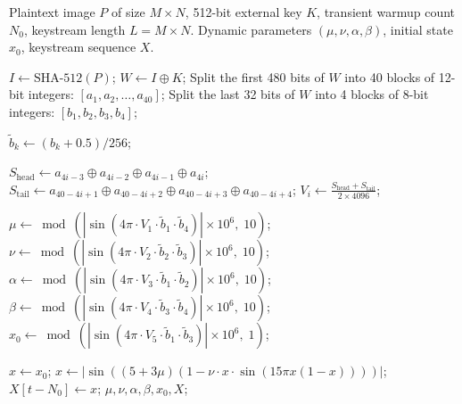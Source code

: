 \begin{algorithm}[htbp]
\caption{SHA-512 and External Key Driven Keystream Generation}
\label{alg:keystream_complete}
\begin{algorithmic}[1]
\REQUIRE Plaintext image $P$ of size $M \times N$, 512-bit external key $K$, transient warmup count $N_0$, keystream length $L = M \times N$.
\ENSURE Dynamic parameters $(\mu, \nu, \alpha, \beta)$, initial state $x_0$, keystream sequence $X$.

\STATE $I \leftarrow \text{SHA-512}(P)$; 
\STATE $W \leftarrow I \oplus K$; 
\STATE Split the first 480 bits of $W$ into 40 blocks of 12-bit integers: $[a_1, a_2, \dots, a_{40}]$;
\STATE Split the last 32 bits of $W$ into 4 blocks of 8-bit integers: $[b_1, b_2, b_3, b_4]$;

    \STATE $\tilde{b}_k \leftarrow (b_k + 0.5) / 256$; 
\ENDFOR

    \STATE $S_{\text{head}} \leftarrow a_{4i-3} \oplus a_{4i-2} \oplus a_{4i-1} \oplus a_{4i}$;
    \STATE $S_{\text{tail}} \leftarrow a_{40-4i+1} \oplus a_{40-4i+2} \oplus a_{40-4i+3} \oplus a_{40-4i+4}$;
    \STATE $V_i \leftarrow \frac{S_{\text{head}} + S_{\text{tail}}}{2 \times 4096}$;
\ENDFOR

\STATE $\mu \leftarrow \bmod\left( \left| \sin(4\pi \cdot V_1 \cdot \tilde{b}_1 \cdot \tilde{b}_4) \right| \times 10^6,\; 10 \right)$;
\STATE $\nu \leftarrow \bmod\left( \left| \sin(4\pi \cdot V_2 \cdot \tilde{b}_2 \cdot \tilde{b}_3) \right| \times 10^6,\; 10 \right)$;
\STATE $\alpha \leftarrow \bmod\left( \left| \sin(4\pi \cdot V_3 \cdot \tilde{b}_1 \cdot \tilde{b}_2) \right| \times 10^6,\; 10 \right)$;
\STATE $\beta \leftarrow \bmod\left( \left| \sin(4\pi \cdot V_4 \cdot \tilde{b}_3 \cdot \tilde{b}_4) \right| \times 10^6,\; 10 \right)$;
\STATE $x_0 \leftarrow \bmod\left( \left| \sin(4\pi \cdot V_5 \cdot \tilde{b}_1 \cdot \tilde{b}_3) \right| \times 10^6,\; 1 \right)$;

\STATE $x \leftarrow x_0$;
    \STATE $x \leftarrow \left| \sin\left( (5 + 3\mu) \left( 1 - \nu \cdot x \cdot \sin(15\pi x (1 - x)) \right) \right) \right|$;
        \STATE $X[t - N_0] \leftarrow x$;
    \ENDIF
\ENDFOR
\RETURN $\mu, \nu, \alpha, \beta, x_0, X$;
\end{algorithmic}
\end{algorithm}
